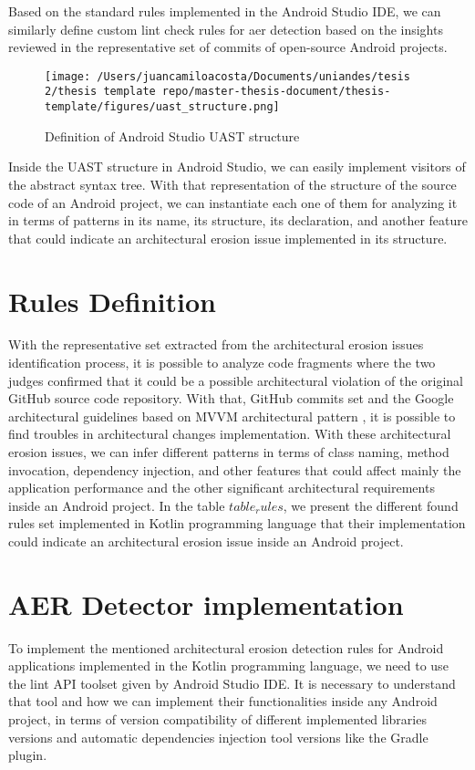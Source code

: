 Based on the standard rules implemented in the Android Studio IDE, we can similarly define custom lint check rules for aer detection based on the insights reviewed in the representative set of commits of open-source Android projects. 

\begin{figure}[h]
    	\centering
    		\texttt{[image: /Users/juancamiloacosta/Documents/uniandes/tesis 2/thesis template repo/master-thesis-document/thesis-template/figures/uast\_structure.png]}
   			 \caption{Definition of Android Studio UAST structure \citet{} }
   			 \label{fig:ast}
\end{figure}

Inside the UAST structure in Android Studio, we can easily implement visitors of the abstract syntax tree. With that representation of the structure of the source code of an Android project, we can instantiate each one of them for analyzing it in terms of patterns in its name, its structure, its declaration, and another feature that could indicate an architectural erosion issue implemented in its structure.

\section{Rules Definition}
With the representative set extracted from the architectural erosion issues identification process, it is possible to analyze code fragments where the two judges confirmed that it could be a possible architectural violation of the original GitHub source code repository. With that, GitHub commits set and the Google architectural guidelines based on MVVM architectural pattern \citet{}, it is possible to find troubles in architectural changes implementation. With these architectural erosion issues, we can infer different patterns in terms of class naming, method invocation, dependency injection, and other features that could affect mainly the application performance and the other significant architectural requirements inside an Android project. In the table $table_rules$, we present the different found rules set implemented in Kotlin programming language that their implementation could indicate an architectural erosion issue inside an Android project.

\section{AER Detector implementation}
To implement the mentioned architectural erosion detection rules for Android applications implemented in the Kotlin programming language, we need to use the lint API toolset given by Android Studio IDE. It is necessary to understand that tool and how we can implement their functionalities inside any Android project, in terms of version compatibility of different implemented libraries versions and automatic dependencies injection tool versions like the Gradle plugin. 

